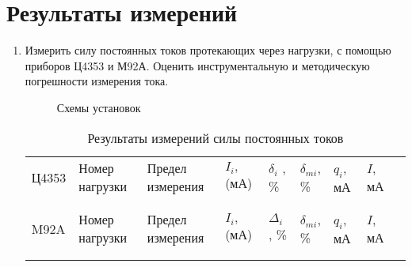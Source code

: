 \section{Результаты измерений}

\begin{enumerate}
\item 
Измерить силу постоянных токов протекающих через нагрузки, с помощью приборов Ц4353 и М92А. Оценить инструментальную и методическую погрешности измерения тока.

\begin{figure}[h]
  \begin{minipage}[h]{0.4\linewidth}
  \end{minipage}
  \hfill
  \begin{minipage}[h]{0.4\linewidth}
  \end{minipage}
  \caption{Схемы установок}
\end{figure}

\hspace{4mm}



\begin{table} [htbp]
  \centering
  \begin{tabular}{| p{1cm} | p{2cm} | p{2cm} | p{2cm} | p{1.5cm} | p{1.5cm} | p{1.5cm} | p{1.5cm}l |}
  \hline
  \centering Ц4353 &\centering Номер нагрузки &\centering Предел измерения &\centering $ I_{i}, $ (мА) &\centering $ \delta_{i}$ , \%  &\centering $ \delta_{mi} $, \% &\centering $ q_{i} $, мА &\centering $ I $, мА &\\ \cline{2-9}
  &\centering &\centering &\centering &\centering &\centering &\centering &\centering  &\\ \cline{2-9}
  &\centering &\centering &\centering &\centering &\centering &\centering &\centering  &\\ \cline{2-9}
  \hline

  \centering M92A &\centering Номер нагрузки &\centering Предел измерения &\centering $ I_{i}, $ (мА) &\centering $ \Delta_{i}$ , \%  &\centering $ \delta_{mi} $, \% &\centering $ q_{i} $, мА &\centering $ I $, мА &\\ \cline{2-9}
  &\centering &\centering &\centering &\centering &\centering &\centering &\centering  &\\ \cline{2-9}
  &\centering &\centering &\centering &\centering &\centering &\centering &\centering  &\\ \cline{2-9}
  \hline
  \end{tabular}
  \caption{Результаты измерений силы постоянных токов}
\end{table}


\end{enumerate}
